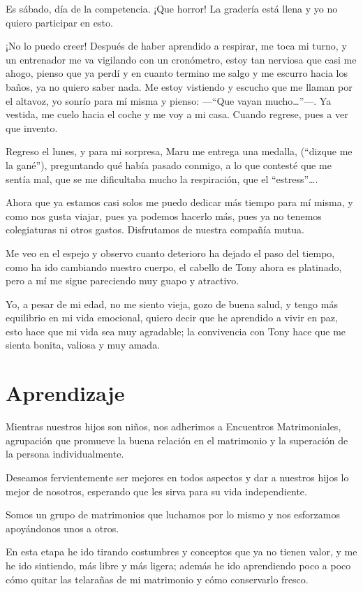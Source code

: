 \documentclass[letterpaper, 12pt]{book}
\begin{document}
Es sábado, día de la competencia. ¡Que horror! La gradería está llena y yo no quiero participar en esto. 

¡No lo puedo creer! Después de haber aprendido a respirar, me toca mi turno, y un entrenador me va vigilando con un cronómetro, estoy tan nerviosa que casi me ahogo, pienso que ya perdí y en cuanto termino me salgo y me escurro hacia los baños, ya no quiero saber nada. Me estoy vistiendo y escucho que me llaman por el altavoz, yo  sonrío para mí misma y pienso: ---``Que vayan mucho\ldots''---.  Ya vestida, me cuelo hacia el coche y me voy a mi casa. Cuando regrese, pues a ver que invento.

Regreso el lunes, y para mi sorpresa, Maru me entrega una medalla, (``dizque me la gané''), preguntando qué había pasado conmigo, a lo que contesté que me sentía mal, que se me dificultaba mucho la respiración, que el ``estress''\ldots.

Ahora que ya estamos casi solos me puedo dedicar más tiempo para mí misma, y como nos gusta viajar, pues ya podemos hacerlo más, pues ya no tenemos colegiaturas ni otros gastos. Disfrutamos de nuestra compañía mutua.

Me veo en el espejo y observo cuanto deterioro ha dejado el paso del tiempo, como ha ido cambiando nuestro cuerpo, el cabello de Tony ahora es platinado, pero a mí me sigue pareciendo muy guapo y atractivo.

Yo, a pesar de mi edad, no me siento vieja, gozo de buena salud, y tengo más equilibrio en mi vida emocional, quiero decir que he aprendido a vivir en paz, esto hace que mi vida sea muy agradable; la convivencia con Tony hace que me sienta bonita, valiosa y muy amada.

\chapter{Aprendizaje}
Mientras nuestros hijos son niños, nos adherimos a Encuentros Matrimoniales, agrupación que promueve la buena relación en el matrimonio y la superación de la persona individualmente.

Deseamos fervientemente ser mejores en todos aspectos y dar a nuestros hijos lo mejor de nosotros, esperando que les sirva para su vida independiente.

Somos un grupo de matrimonios que luchamos por lo mismo y nos esforzamos apoyándonos unos a otros.

En esta etapa he ido tirando costumbres y conceptos que ya no tienen valor, y me he ido sintiendo, más libre y más ligera;
además he ido aprendiendo poco a poco cómo quitar las telarañas de mi matrimonio y cómo conservarlo fresco.
\end{document}
